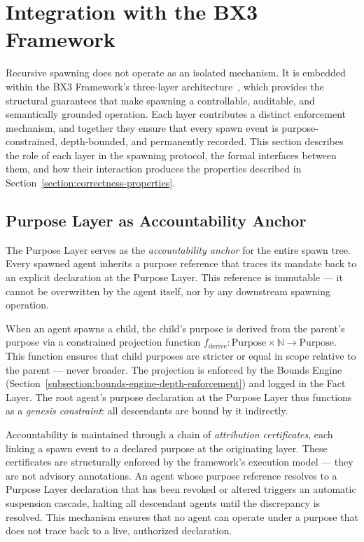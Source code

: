 \section{Integration with the BX3 Framework}
\label{section:integration-with-the-bx3-framework}

Recursive spawning does not operate as an isolated mechanism. It is embedded within the BX3 Framework's three-layer architecture~\cite{bx3framework2026}, which provides the structural guarantees that make spawning a controllable, auditable, and semantically grounded operation. Each layer contributes a distinct enforcement mechanism, and together they ensure that every spawn event is purpose-constrained, depth-bounded, and permanently recorded. This section describes the role of each layer in the spawning protocol, the formal interfaces between them, and how their interaction produces the properties described in Section~\ref{section:correctness-properties}.

\subsection{Purpose Layer as Accountability Anchor}

The Purpose Layer serves as the \textit{accountability anchor} for the entire spawn tree. Every spawned agent inherits a purpose reference that traces its mandate back to an explicit declaration at the Purpose Layer. This reference is immutable — it cannot be overwritten by the agent itself, nor by any downstream spawning operation.

When an agent spawns a child, the child's purpose is derived from the parent's purpose via a constrained projection function $f_{\text{derive}}: \text{Purpose} \times \mathbb{N} \rightarrow \text{Purpose}$. This function ensures that child purposes are stricter or equal in scope relative to the parent — never broader. The projection is enforced by the Bounds Engine (Section~\ref{subsection:bounds-engine-depth-enforcement}) and logged in the Fact Layer. The root agent's purpose declaration at the Purpose Layer thus functions as a \textit{genesis constraint}: all descendants are bound by it indirectly.

Accountability is maintained through a chain of \textit{attribution certificates}, each linking a spawn event to a declared purpose at the originating layer. These certificates are structurally enforced by the framework's execution model — they are not advisory annotations. An agent whose purpose reference resolves to a Purpose Layer declaration that has been revoked or altered triggers an automatic suspension cascade, halting all descendant agents until the discrepancy is resolved. This mechanism ensures that no agent can operate under a purpose that does not trace back to a live, authorized declaration.

